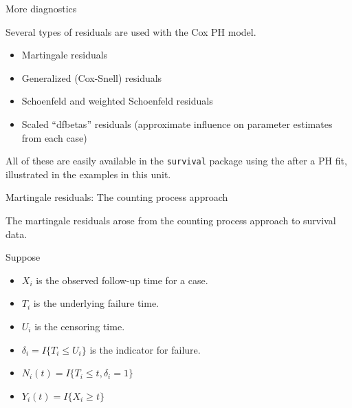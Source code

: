 \documentclass[ignorenonframetext,]{beamer}
\begin{document}
\begin{frame}{%
\protect\hypertarget{more-diagnostics}{%
More diagnostics}}

Several types of residuals are used with the Cox PH model.

\begin{itemize}
\item
  Martingale residuals
\item
  Generalized (Cox-Snell) residuals
\item
  Schoenfeld and weighted Schoenfeld residuals
\item
  Scaled “dfbetas” residuals (approximate influence on parameter
  estimates from each case)
\end{itemize}

All of these are easily available in the \texttt{survival} package using
the  after a PH fit, illustrated in the examples in
this unit.

\end{frame}

\begin{frame}{%
\protect\hypertarget{martingale-residuals-the-counting-process-approach}{%
Martingale residuals: The counting process approach}}

The martingale residuals arose from the counting process approach to
survival data.

Suppose

\begin{itemize}
\item
  \(X_i\) is the observed follow-up time for a case.
\item
  \(T_i\) is the underlying failure time.
\item
  \(U_i\) is the censoring time.
\item
  \(\delta_i = I\{T_i \leq U_i\}\) is the indicator for failure.
\item
  \(N_i(t) = I\{T_i \leq t, \delta_i = 1\}\)
\item
  \(Y_i(t) = I\{X_i \ge t\}\)
\end{itemize}

\end{frame}
\end{document}
